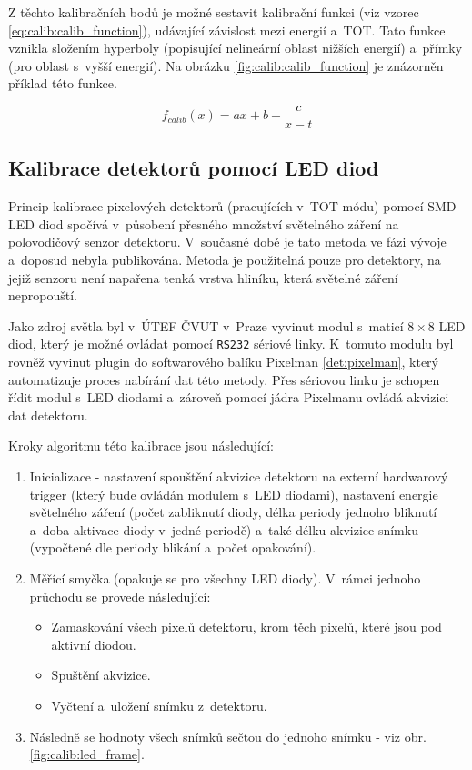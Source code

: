 Z těchto kalibračních bodů je možné sestavit kalibrační funkci (viz vzorec \ref{eq:calib:calib_function}), udávající závislost mezi energií a~TOT. Tato funkce vznikla složením hyperboly (popisující nelineární oblast nižších energií) a~přímky (pro oblast s~vyšší energií). Na obrázku \ref{fig:calib:calib_function} je znázorněn příklad této funkce.

\begin{equation}\label{eq:calib:calib_function}
	f_{calib}(x) = ax + b - \frac{c}{x-t}
\end{equation}


\subsection{Kalibrace detektorů pomocí LED diod}\label{calib:led}
Princip kalibrace pixelových detektorů (pracujících v~TOT módu) pomocí SMD LED diod spočívá v~působení přesného množství světelného záření na polovodičový senzor detektoru. V~současné době je tato metoda ve fázi vývoje a~doposud nebyla publikována. Metoda je použitelná pouze pro detektory, na jejiž senzoru není napařena tenká vrstva hliníku, která světelné záření nepropouští. 

Jako zdroj světla byl v~ÚTEF ČVUT v~Praze vyvinut modul s~maticí $8\times8$ LED diod, který je možné ovládat pomocí \texttt{RS232} sériové linky. K~tomuto modulu byl rovněž vyvinut plugin do softwarového balíku Pixelman \ref{det:pixelman}, který automatizuje proces nabírání dat této metody. Přes sériovou linku je schopen řídit modul s~LED diodami a~zároveň pomocí jádra Pixelmanu ovládá akvizici dat detektoru.

Kroky algoritmu této kalibrace jsou následující:
\begin{enumerate}
	\item Inicializace - nastavení spouštění akvizice detektoru na externí hardwarový trigger (který bude ovládán modulem s~LED diodami), nastavení energie světelného záření (počet zabliknutí diody, délka periody jednoho bliknutí a~doba aktivace diody v~jedné periodě) a~také délku akvizice snímku (vypočtené dle periody blikání a~počet opakování).
	\item Měřící smyčka (opakuje se pro všechny LED diody). V~rámci jednoho průchodu se provede následující:
		\begin{itemize}
			\item Zamaskování všech pixelů detektoru, krom těch pixelů, které jsou pod aktivní diodou.
			\item Spuštění akvizice.
			\item Vyčtení a~uložení snímku z~detektoru.
		\end{itemize}
	\item Následně se hodnoty všech snímků sečtou do jednoho snímku - viz obr. \ref{fig:calib:led_frame}.
\end{enumerate}

